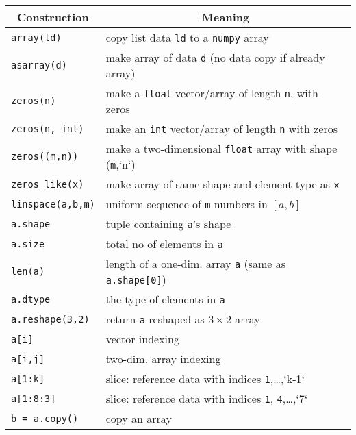 \documentclass[graybox,sectrefs,envcountresetchap,open=right,final]{svmonodo}
\begin{document}
\begin{center}
{\small   %

\vspace{4mm}

\begin{tabular}{ll}
\hline
\multicolumn{1}{c}{ Construction } & \multicolumn{1}{c}{ Meaning } \\
\hline
\texttt{array(ld)}       & copy list data \texttt{ld} to a \texttt{numpy} array                    \\
\texttt{asarray(d)}      & make array of data \texttt{d} (no data copy if already array)         \\
\texttt{zeros(n)}        & make a \texttt{float} vector/array of length \texttt{n}, with zeros     \\
\texttt{zeros(n, int)}   & make an \texttt{int} vector/array of length \texttt{n} with zeros       \\
\texttt{zeros((m,n))}    & make a two-dimensional \texttt{float} array with shape (\texttt{m},`n`) \\
\Verb!zeros_like(x)!   & make array of same shape and element type as \texttt{x}               \\
\texttt{linspace(a,b,m)} & uniform sequence of \texttt{m} numbers in $[a,b]$                     \\
\texttt{a.shape}         & tuple containing \texttt{a}'s shape                                   \\
\texttt{a.size}          & total no of elements in \texttt{a}                                    \\
\texttt{len(a)}          & length of a one-dim. array \texttt{a} (same as \texttt{a.shape[0]})     \\
\texttt{a.dtype}         & the type of elements in \texttt{a}                                    \\
\texttt{a.reshape(3,2)}  & return \texttt{a} reshaped as $3\times 2$ array                       \\
\texttt{a[i]}            & vector indexing                                                     \\
\texttt{a[i,j]}          & two-dim. array indexing                                             \\
\texttt{a[1:k]}          & slice: reference data with indices \texttt{1},\ldots,`k-1`            \\
\texttt{a[1:8:3]}        & slice: reference data with indices \texttt{1}, \texttt{4},\ldots,`7`    \\
\texttt{b = a.copy()}    & copy an array                                                       \\
\hline
\end{tabular}

\vspace{4mm}

}
\end{center}
\end{document}
